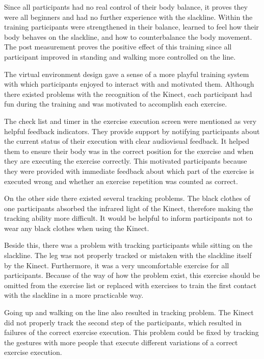 Since all participants had no real control of their body balance, it proves they were all beginners and had no further experience with the slackline.
Within the training participants were strengthened in their balance, learned to feel how their body behaves on the slackline, and how to counterbalance the body movement.
The post measurement proves the positive effect of this training since all participant improved in standing and walking more controlled on the line.

The virtual environment design gave a sense of a more playful training system with which participants enjoyed to interact with and motivated them.
Although there existed problems with the recognition of the Kinect, each participant had fun during the training and was motivated to accomplish each exercise.

The check list and timer in the exercise execution screen were mentioned as very helpful feedback indicators.
They provide support by notifying participants about the current status of their execution with clear audiovisual feedback.
It helped them to ensure their body was in the correct position for the exercise and when they are executing the exercise correctly.
This motivated participants because they were provided with immediate feedback about which part of the exercise is executed wrong and whether an exercise repetition was counted as correct.

On the other side there existed several tracking problems.
The black clothes of one participants absorbed the infrared light of the Kinect, therefore making the tracking ability more difficult.
It would be helpful to inform participants not to wear any black clothes when using the Kinect.

Beside this, there was a problem with tracking participants while sitting on the slackline.
The leg was not properly tracked or mistaken with the slackline itself by the Kinect.
Furthermore, it was a very uncomfortable exercise for all participants.
Because of the way of how the problem exist, this exercise should be omitted from the exercise list or replaced with exercises to train the first contact with the slackline in a more practicable way.

Going up and walking on the line also resulted in tracking problem.
The Kinect did not properly track the second step of the participants, which resulted in failures of the correct exercise execution.
This problem could be fixed by tracking the gestures with more people that execute different variations of a correct exercise execution.

